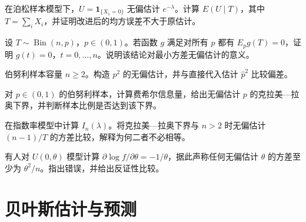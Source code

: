\begin{exercise}[拉奥—布莱克改进]\label{q:B11.3}
在泊松样本模型下，$U=\mathbf1_{\{X_1=0\}}$ 无偏估计 $e^{-\lambda}$。计算 $E(U\mid T)$，其中 $T=\sum_iX_i$，并证明改进后的均方误差不大于原估计。\par{}\end{exercise}

\begin{exercise}[二项族的完全性]\label{q:B11.4}
设 $T\sim\operatorname{Bin}(n,p)$，$p\in(0,1)$。若函数 $g$ 满足对所有 $p$ 都有 $E_pg(T)=0$，证明 $g(t)=0$，$t=0,\ldots,n$。说明该结论对最小方差无偏估计的意义。\par{}\end{exercise}

\begin{exercise}[估计平方概率]\label{q:B11.5}
伯努利样本容量 $n\ge2$。构造 $p^2$ 的无偏估计，并与直接代入估计 $\widehat p^2$ 比较偏差。\par{}\end{exercise}

\begin{exercise}[伯努利模型的信息量与下界]\label{q:B11.6}
对 $p\in(0,1)$ 的伯努利样本，计算费希尔信息量，给出无偏估计 $p$ 的克拉美—拉奥下界，并判断样本比例是否达到该下界。\par{}\end{exercise}

\begin{exercise}[信息下界并非总能达到]\label{q:B11.7}
在指数率模型中计算 $I_n(\lambda)$。将克拉美—拉奥下界与 $n>2$ 时无偏估计 $(n-1)/T$ 的方差比较，解释为何二者不必相等。\par{}\end{exercise}

\begin{exercise}[非正则模型中的错误下界]\label{q:B11.8}
有人对 $U(0,\theta)$ 模型计算 $\partial\log f/\partial\theta=-1/\theta$，据此声称任何无偏估计 $\theta$ 的方差至少为 $\theta^2/n$。指出错误，并给出反证性比较。\par{}\end{exercise}

\clearpage\section{贝叶斯估计与预测}

